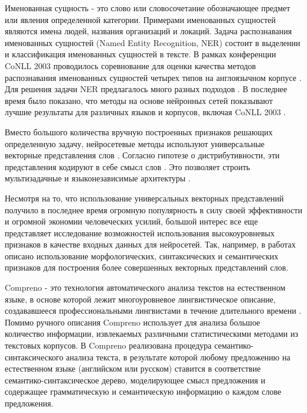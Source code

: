 \Introduction

  Именованная сущность - это слово или словосочетание обозначающее
  предмет или явления определенной категории. Примерами именованных сущностей
  являются имена людей, названия организаций и локаций.
  Задача распознавания именованных сущностей (Named Entity Recognition, NER)
  состоит в выделении и классификация именованных сущностей в тексте.
  В рамках конференции CoNLL 2003 проводилось соревнование
  для оценки качества методов распознавания именованных сущностей четырех типов
  на англоязычном корпусе \citep{tjong2003introduction}.
  Для решения задачи NER предлагалось много разных подходов \citep{nadeau2007survey}.
  В последнее время было показано, что методы на основе нейронных сетей показывают
  лучшие результаты для различных языков и корпусов, включая CoNLL 2003 \citep{DBLP:journals/corr/YangSC16}.

  Вместо большого количества вручную построенных признаков
  решающих определенную задачу, нейросетевые методы используют универсальные
  векторные представления слов \citep{mikolov2013distributed}.
  Согласно гипотезе о дистрибутивности, эти представления
  кодируют в себе смысл слов \citep{sahlgren2008distributional}.
  Это позволяет строить мультизадачные и языконезависимые
  архитектуры \citep{collobert2011natural, DBLP:journals/corr/YangSC16}.

  Несмотря на то, что использование универсальных векторных представлений
  получило в последнее время огромную популярность в силу своей эффективности
  и огромной экономии человеческих усилий, большой интерес все еще представляет
  исследование возможностей использования высокоуровневых признаков
  в качестве входных данных для нейросетей.
  Так, например, в работах \citep{xu2014rc, bian2014knowledge} описано использование
  морфологических, синтаксических и семантических признаков для построения
  более совершенных векторных представлений слов.

  Compreno -  это технология автоматического анализа текстов на естественном языке,
  в основе которой
  лежит многоуровневое лингвистическое описание, создававшееся профессиональными
  лингвистами в течение длительного времени \citep{anisimovich2012syntactic}.
  Помимо ручного описания Compreno использует для анализа большое количество
  информации, извлекаемых различными статистическими методами из текстовых корпусов.
  В Compreno реализована процедура семантико-синтаксического анализа текста,
  в результате которой любому предложению на естественном языке (английском или русском)
  ставится в соответствие семантико-синтаксическое дерево, моделирующее смысл предложения
  и содержащее грамматическую и семантическую информацию о каждом слове предложения.

